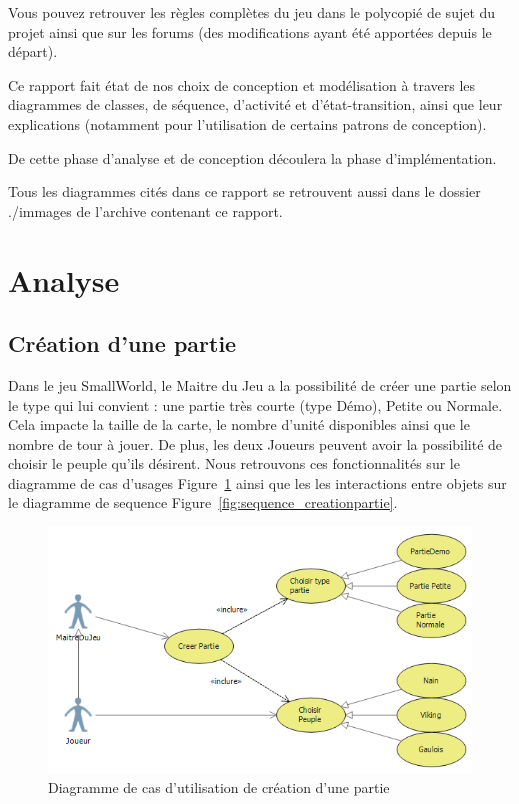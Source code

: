 \documentclass[a4paper]{article}%
\begin{document}
\medskip

Vous pouvez retrouver les règles complètes du jeu dans le polycopié de sujet du projet ainsi que sur les forums (des modifications ayant été apportées depuis le départ).

\medskip

Ce rapport fait état de nos choix de conception et modélisation à travers les diagrammes de classes, de séquence, d'activité et d'état-transition, ainsi que leur explications (notamment pour l'utilisation de certains patrons de conception).

De cette phase d'analyse et de conception découlera la phase d'implémentation.

\medskip

Tous les diagrammes cités dans ce rapport se retrouvent aussi dans le dossier ./immages de l'archive contenant ce rapport.

\newpage

\section{Analyse}


\subsection{Création d'une partie}

Dans le jeu SmallWorld, le Maitre du Jeu a la possibilité de créer une partie selon le type qui lui convient : une partie très courte (type Démo), Petite ou Normale. Cela impacte la taille de la carte, le nombre d'unité disponibles ainsi que le nombre de tour à jouer. De plus, les deux Joueurs peuvent avoir la possibilité de choisir le peuple qu'ils désirent.
Nous retrouvons ces fonctionnalités sur le diagramme de cas d'usages Figure~\ref{fig:use_case_creationpartie} ainsi que les les interactions entre objets sur le diagramme de sequence Figure~\ref{fig:sequence_creationpartie}.


\begin{figure}[H]
    \centering
    \includegraphics[width=\textwidth]{./images/use_case/DiagUseCaseCreationPartie.png}
                \caption{Diagramme de cas d'utilisation de création d'une partie}
                \label{fig:use_case_creationpartie}
\end{figure}
\end{document}

